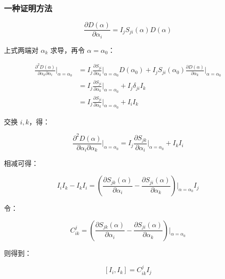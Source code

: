 \subsubsection*{一种证明方法}

\begin{equation}
\frac{\partial D\left(\alpha\right) }{\partial \alpha_i } 
=I_j S_{ji}\left(\alpha\right)D\left(\alpha\right)
\end{equation}

上式两端对 $\alpha_k$ 求导，再令 $\alpha=\alpha_0$：

\begin{align}
\frac{\partial^2 D\left(\alpha\right) }{\partial \alpha_k \partial \alpha_i }\bigg|_{\alpha=\alpha_0}
&=I_j\frac{\partial S_{ji} }{\partial \alpha_k }\bigg|_{\alpha=\alpha_0} D\left(\alpha_0\right) + I_j S_{ji}\left(\alpha_0\right)\frac{\partial D\left(\alpha\right) }{\partial \alpha_k }\bigg|_{\alpha=\alpha_0} \\
&=I_j\frac{\partial S_{ji} }{\partial \alpha_k }\bigg|_{\alpha=\alpha_0} + I_j\delta_{ji} I_k \\
&=I_j\frac{\partial S_{ji} }{\partial \alpha_k }\bigg|_{\alpha=\alpha_0} + I_i I_k
\end{align}

交换 $i,k$，得：

\begin{equation}
\frac{\partial^2 D\left(\alpha\right) }{\partial \alpha_i \partial \alpha_k }\bigg|_{\alpha=\alpha_0}
=I_j \frac{\partial S_{jk} }{\partial \alpha_i }\bigg|_{\alpha=\alpha_0} + I_k I_i
\end{equation}

相减可得：

\begin{equation}
I_i I_k - I_k I_i
=\left(\frac{\partial S_{jk}\left(\alpha\right) }{\partial \alpha_i } - \frac{\partial S_{ji}\left(\alpha\right) }{\partial\alpha_k }  \right)\bigg|_{\alpha=\alpha_0} I_j
\end{equation}

令：

\begin{equation}
C_{ik}^j
=\left(\frac{\partial S_{jk}\left(\alpha\right) }{\partial \alpha_i } - \frac{\partial S_{ji}\left(\alpha\right) }{\partial\alpha_k }  \right)\bigg|_{\alpha=\alpha_0}
\end{equation}

则得到：

\begin{equation}
\left[I_i,I_k\right]
=C_{ik}^j I_j
\end{equation}

